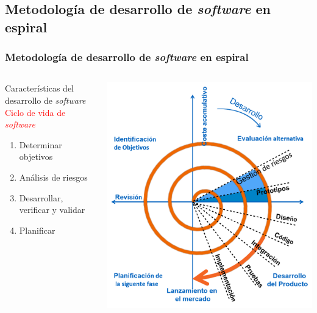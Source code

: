 \documentclass{beamer}%
\begin{document}
\subsection{Metodolog\'ia de desarrollo de \textit{software} en espiral}
\begin{frame}
\frametitle{\textbf{Metodolog\'ia de desarrollo de \textit{software} en espiral}}
\begin{columns}[t]
  \begin{block}{Caracter\'isticas del desarrollo de \textit{software}}
  \textcolor{red}{Ciclo de vida de \textit{software}} \\
  \begin{enumerate}
  \item Determinar objetivos
  \item An\'alisis de riesgos
  \item Desarrollar, verificar y validar
  \item Planificar
  \end{enumerate}
\end{block}
\begin{center}\includegraphics[height=0.6\textheight]{espiral.jpg}\end{center}
  \end{columns}
\end{frame}
\end{document}
